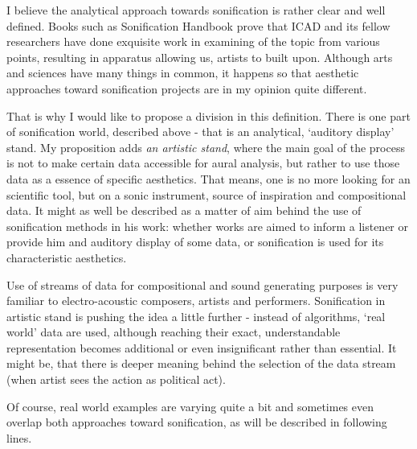 \documentclass[12pt,a4paper,oneside]{report}
\begin{document}
I believe the analytical approach towards sonification is rather clear and well defined. Books such as Sonification Handbook prove that ICAD and its fellow researchers have done exquisite work in examining of the topic from various points, resulting in apparatus allowing us, artists to built upon. Although arts and sciences have many things in common, it happens so that aesthetic approaches toward sonification projects are in my opinion quite different.


That is why I would like to propose a division in this definition. There is one part of sonification world, described above - that is an analytical, `auditory display' stand. My proposition adds \emph{an artistic stand}, where the main goal of the process is not to make certain data accessible for aural analysis, but rather to use those data as a essence of specific aesthetics. That means, one is no more looking for an scientific tool, but on a sonic instrument, source of inspiration and compositional data. It might as well be described as a matter of aim behind the use of sonification methods in his work: whether works are aimed to inform a listener or provide him and auditory display of some data, or sonification is used for its characteristic aesthetics.

Use of streams of data for compositional and sound generating purposes is very familiar to electro-acoustic composers, artists and performers. Sonification in artistic stand is pushing the idea a little further - instead of algorithms, `real world' data are used, although reaching their exact, understandable representation becomes additional or even insignificant rather than essential. It might be, that there is deeper meaning behind the selection of the data stream (when artist sees the action as political act).

Of course, real world examples are varying quite a bit and sometimes even overlap both approaches toward sonification, as will be described in following lines.
\end{document}
